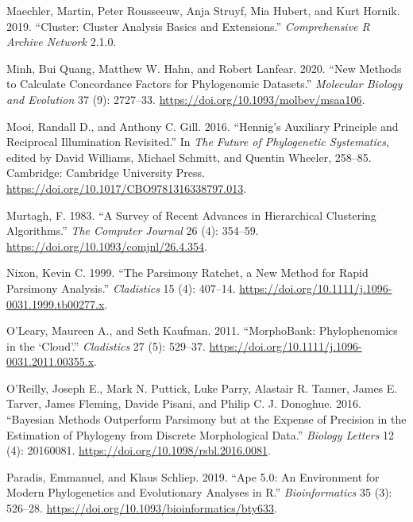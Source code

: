\begin{CSLReferences}{1}{0}
\leavevmode{}%
Maechler, Martin, Peter Rousseeuw, Anja Struyf, Mia Hubert, and Kurt Hornik. 2019. {``Cluster: Cluster {Analysis Basics} and {Extensions}.''} \emph{Comprehensive R Archive Network} 2.1.0.

\leavevmode{}%
Minh, Bui Quang, Matthew W. Hahn, and Robert Lanfear. 2020. {``New Methods to Calculate Concordance Factors for Phylogenomic Datasets.''} \emph{Molecular Biology and Evolution} 37 (9): 2727--33. \url{https://doi.org/10.1093/molbev/msaa106}.

\leavevmode{}%
Mooi, Randall D., and Anthony C. Gill. 2016. {``Hennig's Auxiliary Principle and Reciprocal Illumination Revisited.''} In \emph{The {Future} of {Phylogenetic Systematics}}, edited by David Williams, Michael Schmitt, and Quentin Wheeler, 258--85. {Cambridge}: {Cambridge University Press}. \url{https://doi.org/10.1017/CBO9781316338797.013}.

\leavevmode{}%
Murtagh, F. 1983. {``A Survey of Recent Advances in Hierarchical Clustering Algorithms.''} \emph{The Computer Journal} 26 (4): 354--59. \url{https://doi.org/10.1093/comjnl/26.4.354}.

\leavevmode{}%
Nixon, Kevin C. 1999. {``The {Parsimony Ratchet}, a New Method for Rapid Parsimony Analysis.''} \emph{Cladistics} 15 (4): 407--14. \url{https://doi.org/10.1111/j.1096-0031.1999.tb00277.x}.

\leavevmode{}%
O'Leary, Maureen A., and Seth Kaufman. 2011. {``{MorphoBank}: Phylophenomics in the {`Cloud'}.''} \emph{Cladistics} 27 (5): 529--37. \url{https://doi.org/10.1111/j.1096-0031.2011.00355.x}.

\leavevmode{}%
O'Reilly, Joseph E., Mark N. Puttick, Luke Parry, Alastair R. Tanner, James E. Tarver, James Fleming, Davide Pisani, and Philip C. J. Donoghue. 2016. {``Bayesian Methods Outperform Parsimony but at the Expense of Precision in the Estimation of Phylogeny from Discrete Morphological Data.''} \emph{Biology Letters} 12 (4): 20160081. \url{https://doi.org/10.1098/rsbl.2016.0081}.

\leavevmode{}%
Paradis, Emmanuel, and Klaus Schliep. 2019. {``Ape 5.0: An Environment for Modern Phylogenetics and Evolutionary Analyses in {R}.''} \emph{Bioinformatics} 35 (3): 526--28. \url{https://doi.org/10.1093/bioinformatics/bty633}.


\end{CSLReferences}
